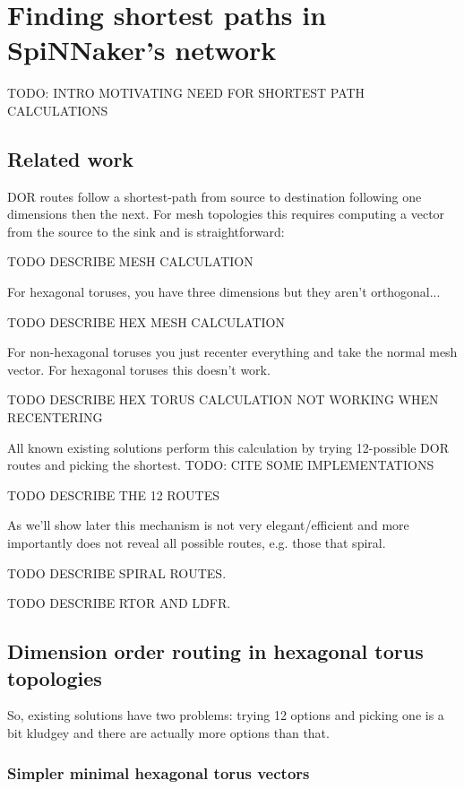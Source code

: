 \chapter{Finding shortest paths in SpiNNaker's network}
	
	TODO: INTRO MOTIVATING NEED FOR SHORTEST PATH CALCULATIONS
	
	\section{Related work}
		
		DOR routes follow a shortest-path from source to destination following one
		dimensions then the next. For mesh topologies this requires computing a
		vector from the source to the sink and is straightforward:
		
		TODO DESCRIBE MESH CALCULATION
		
		For hexagonal toruses, you have three dimensions but they aren't
		orthogonal... \cite{patel15}
		
		TODO DESCRIBE HEX MESH CALCULATION
		
		For non-hexagonal toruses you just recenter everything and take the normal
		mesh vector. For hexagonal toruses this doesn't work.
		
		TODO DESCRIBE HEX TORUS CALCULATION NOT WORKING WHEN RECENTERING
		
		All known existing solutions perform this calculation by trying 12-possible
		DOR routes and picking the shortest. TODO: CITE SOME IMPLEMENTATIONS
		
		TODO DESCRIBE THE 12 ROUTES
		
		As we'll show later this mechanism is not very elegant/efficient and more
		importantly does not reveal all possible routes, e.g. those that spiral.
		
		TODO DESCRIBE SPIRAL ROUTES.
		
		TODO DESCRIBE RTOR AND LDFR.
		
	\section{Dimension order routing in hexagonal torus topologies}
		
		So, existing solutions have two problems: trying 12 options and picking one
		is a bit kludgey and there are actually more options than that.
		
		\subsection{Simpler minimal hexagonal torus vectors}
			
